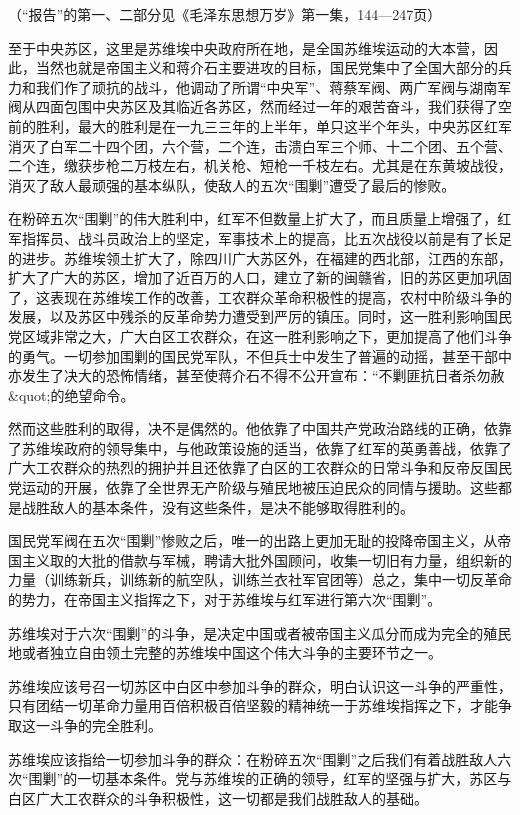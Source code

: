 （“报告”的第一、二部分见《毛泽东思想万岁》第一集，144—247页）

至于中央苏区，这里是苏维埃中央政府所在地，是全国苏维埃运动的大本营，因此，当然也就是帝国主义和蒋介石主要进攻的目标，国民党集中了全国大部分的兵力和我们作了顽抗的战斗，他调动了所谓“中央军”、蒋蔡军阀、两广军阀与湖南军阀从四面包围中央苏区及其临近各苏区，然而经过一年的艰苦奋斗，我们获得了空前的胜利，最大的胜利是在一九三三年的上半年，单只这半个年头，中央苏区红军消灭了白军二十四个团，六个营，二个连，击溃白军三个师、十二个团、五个营、二个连，缴获步枪二万枝左右，机关枪、短枪一千枝左右。尤其是在东黄坡战役，消灭了敌人最顽强的基本纵队，使敌人的五次“围剿”遭受了最后的惨败。

在粉碎五次“围剿”的伟大胜利中，红军不但数量上扩大了，而且质量上增强了，红军指挥员、战斗员政治上的坚定，军事技术上的提高，比五次战役以前是有了长足的进步。苏维埃领土扩大了，除四川广大苏区外，在福建的西北部，江西的东部，扩大了广大的苏区，增加了近百万的人口，建立了新的闽赣省，旧的苏区更加巩固了，这表现在苏维埃工作的改善，工农群众革命积极性的提高，农村中阶级斗争的发展，以及苏区中残杀的反革命势力遭受到严厉的镇压。同时，这一胜利影响国民党区域非常之大，广大白区工农群众，在这一胜利影响之下，更加提高了他们斗争的勇气。一切参加围剿的国民党军队，不但兵士中发生了普遍的动摇，甚至干部中亦发生了决大的恐怖情绪，甚至使蒋介石不得不公开宣布：“不剿匪抗日者杀勿赦&quot;的绝望命令。

然而这些胜利的取得，决不是偶然的。他依靠了中国共产党政治路线的正确，依靠了苏维埃政府的领导集中，与他政策设施的适当，依靠了红军的英勇善战，依靠了广大工农群众的热烈的拥护并且还依靠了白区的工农群众的日常斗争和反帝反国民党运动的开展，依靠了全世界无产阶级与殖民地被压迫民众的同情与援助。这些都是战胜敌人的基本条件，没有这些条件，是决不能够取得胜利的。

国民党军阀在五次“围剿”惨败之后，唯一的出路上更加无耻的投降帝国主义，从帝国主义取的大批的借款与军械，聘请大批外国顾问，收集一切旧有力量，组织新的力量（训练新兵，训练新的航空队，训练兰衣社军官团等）总之，集中一切反革命的势力，在帝国主义指挥之下，对于苏维埃与红军进行第六次“围剿”。

苏维埃对于六次“围剿”的斗争，是决定中国或者被帝国主义瓜分而成为完全的殖民地或者独立自由领土完整的苏维埃中国这个伟大斗争的主要环节之一。

苏维埃应该号召一切苏区中白区中参加斗争的群众，明白认识这一斗争的严重性，只有团结一切革命力量用百倍积极百倍坚毅的精神统一于苏维埃指挥之下，才能争取这一斗争的完全胜利。

苏维埃应该指给一切参加斗争的群众：在粉碎五次“围剿”之后我们有着战胜敌人六次“围剿”的一切基本条件。党与苏维埃的正确的领导，红军的坚强与扩大，苏区与白区广大工农群众的斗争积极性，这一切都是我们战胜敌人的基础。

